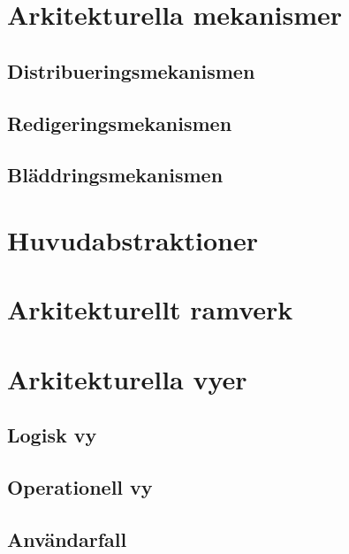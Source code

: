 \section{Arkitekturella mekanismer}
\subsection{Distribueringsmekanismen}
\subsection{Redigeringsmekanismen}
\subsection{Bläddringsmekanismen}
\section{Huvudabstraktioner}
\section{Arkitekturellt ramverk}
\section{Arkitekturella vyer}
\subsection{Logisk vy}
\subsection{Operationell vy}
\subsection{Användarfall}

